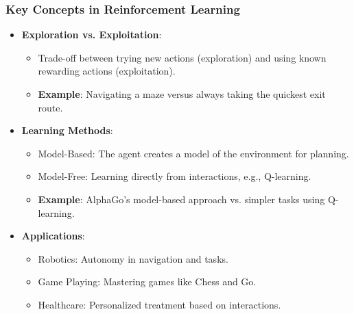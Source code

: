 \documentclass[aspectratio=169]{beamer}
\begin{document}
\begin{frame}[fragile]
    \frametitle{Key Concepts in Reinforcement Learning}
    \begin{itemize}
        \item \textbf{Exploration vs. Exploitation}:
        \begin{itemize}
            \item Trade-off between trying new actions (exploration) and using known rewarding actions (exploitation).
            \item \textbf{Example}: Navigating a maze versus always taking the quickest exit route.
        \end{itemize}

        \item \textbf{Learning Methods}: 
        \begin{itemize}
            \item Model-Based: The agent creates a model of the environment for planning.
            \item Model-Free: Learning directly from interactions, e.g., Q-learning.
            \item \textbf{Example}: AlphaGo's model-based approach vs. simpler tasks using Q-learning.
        \end{itemize}

        \item \textbf{Applications}:
        \begin{itemize}
            \item Robotics: Autonomy in navigation and tasks.
            \item Game Playing: Mastering games like Chess and Go.
            \item Healthcare: Personalized treatment based on interactions.
        \end{itemize}
    \end{itemize}
\end{frame}
\end{document}
